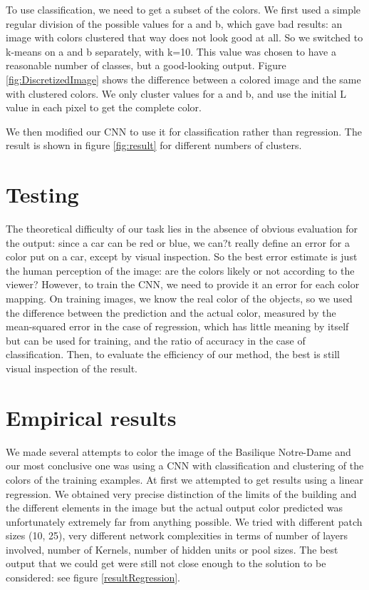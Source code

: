 \documentclass[10pt,twocolumn]{article}
\begin{document}
To use classification, we need to get a subset of the colors. We first used a simple regular division of the possible values for a and b, which gave bad results: an image with colors clustered that way does not look good at all. So we switched to k-means on a and b separately, with k=10. This value was chosen to have a reasonable number of classes, but a good-looking output. Figure \ref{fig:DiscretizedImage} shows the difference between a colored image and the same with clustered colors. We only cluster values for a and b, and use the initial L value in each pixel to get the complete color.

We then modified our CNN to use it for classification rather than regression. The result is shown in figure \ref{fig:result} for different numbers of clusters.

\section{Testing}
The theoretical difficulty of our task lies in the absence of obvious evaluation for the output: since a car can be red or blue, we can?t really define an error for a color put on a car, except by visual inspection. So the best error estimate is just the human perception of the image: are the colors likely or not according to the viewer? However, to train the CNN, we need to provide it an error for each color mapping. On training images, we know the real color of the objects, so we used the difference between the prediction and the actual color, measured by the mean-squared error in the case of regression, which has little meaning by itself but can be used for training, and the ratio of accuracy in the case of classification. Then, to evaluate the efficiency of our method, the best is still visual inspection of the result.

\section{Empirical results} 
We made several attempts to color the image of the Basilique Notre-Dame and our most conclusive one was using a CNN with classification and clustering of the colors of the training examples.
At first we attempted to get results using a linear regression. We obtained very precise distinction of the limits of the building and the different elements in the image but the actual output color predicted was unfortunately extremely far from anything possible. We tried with different patch sizes (10, 25), very different network complexities in terms of number of layers involved, number of Kernels, number of hidden units or pool sizes. The best output that we could get were still not close enough to the solution to be considered: see figure \ref{resultRegression}.
\end{document}

